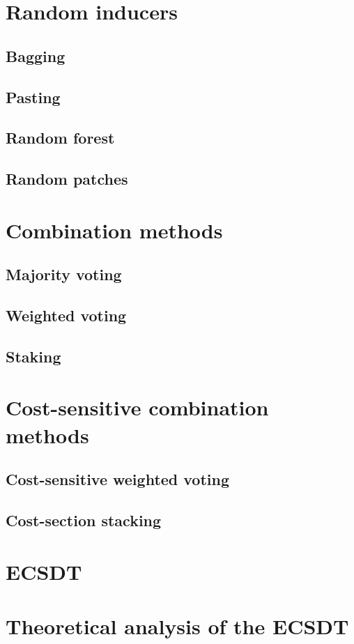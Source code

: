 \documentclass[twoside,openright,titlepage,numbers=noenddot,headinclude,%
               footinclude=true,cleardoublepage=empty,abstractoff,BCOR=5mm,%
               paper=a4,fontsize=11pt,ngerman,american]{scrreprt}
\numberwithin{theorem}{chapter}
\numberwithin{definition}{chapter}
\numberwithin{algorithm}{chapter}
\numberwithin{figure}{chapter}
\numberwithin{table}{chapter}
\numberwithin{equation}{chapter}
\begin{document}
			\section{Random inducers}
				\subsection{Bagging}
				\subsection{Pasting}
				\subsection{Random forest}
				\subsection{Random patches}
			\section{Combination methods}
				\subsection{Majority voting}
				\subsection{Weighted voting}
				\subsection{Staking}
		\section{Cost-sensitive combination methods}
			\subsection{Cost-sensitive weighted voting}
			\subsection{Cost-section stacking}
		\section{ECSDT}
		\section{Theoretical analysis of the ECSDT}
\end{document}
